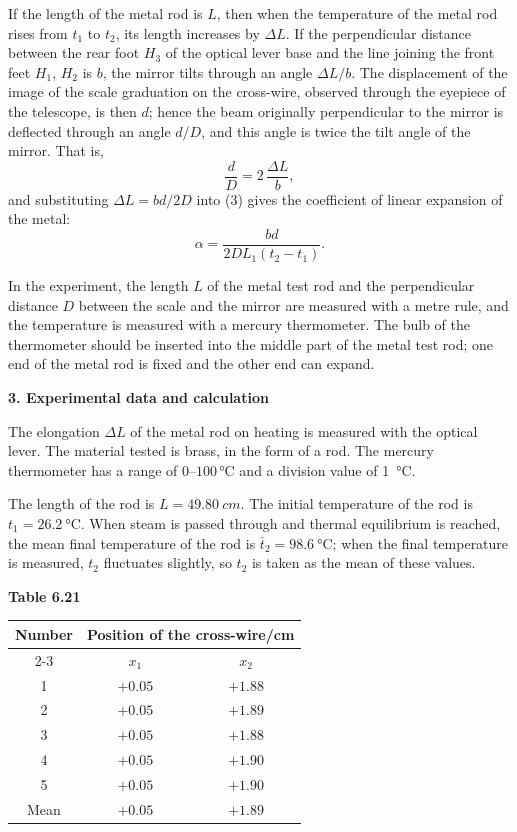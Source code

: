 If the length of the metal rod is $L$, then when the temperature of the metal rod rises from $t_1$ to $t_2$, its length increases by $\Delta L$. If the perpendicular distance between the rear foot $H_3$ of the optical lever base and the line joining the front feet $H_1$, $H_2$ is $b$, the mirror tilts through an angle $\Delta L/b$. The displacement of the image of the scale graduation on the cross-wire, observed through the eyepiece of the telescope, is then $d$; hence the beam originally perpendicular to the mirror is deflected through an angle $d/D$, and this angle is twice the tilt angle of the mirror. That is,
\begin{equation*}
\frac{d}{D}=2\,\frac{\Delta L}{b},
\end{equation*}
and substituting $\Delta L=bd/2D$ into (3) gives the coefficient of linear expansion of the metal:
\begin{equation}\tag{4}
\alpha=\frac{bd}{2DL_1(t_2-t_1)}.
\end{equation}

In the experiment, the length $L$ of the metal test rod and the perpendicular distance $D$ between the scale and the mirror are measured with a metre rule, and the temperature is measured with a mercury thermometer. The bulb of the thermometer should be inserted into the middle part of the metal test rod; one end of the metal rod is fixed and the other end can expand.

\textbf{3. Experimental data and calculation}

The elongation $\Delta L$ of the metal rod on heating is measured with the optical lever. The material tested is brass, in the form of a rod. The mercury thermometer has a range of $0$--$100$\,\si{\celsius} and a division value of \SI{1}{\celsius}.

The length of the rod is $L=\SI{49.80}{cm}$. The initial temperature of the rod is $t_1=\SI{26.2}{\celsius}$. When steam is passed through and thermal equilibrium is reached, the mean final temperature of the rod is $\bar t_2=\SI{98.6}{\celsius}$; when the final temperature is measured, $t_2$ fluctuates slightly, so $t_2$ is taken as the mean of these values.

\begin{center}
\textbf{Table 6.21}\\[3pt]
\begin{tabular}{ccc}
\toprule
Number & \multicolumn{2}{c}{Position of the cross-wire/cm}\\
\cmidrule(lr){2-3}
 & $x_1$ & $x_2$\\
\midrule
1 & $+0.05$ & $+1.88$\\
2 & $+0.05$ & $+1.89$\\
3 & $+0.05$ & $+1.88$\\
4 & $+0.05$ & $+1.90$\\
5 & $+0.05$ & $+1.90$\\
\midrule
Mean & $+0.05$ & $+1.89$\\
\bottomrule
\end{tabular}
\end{center}

